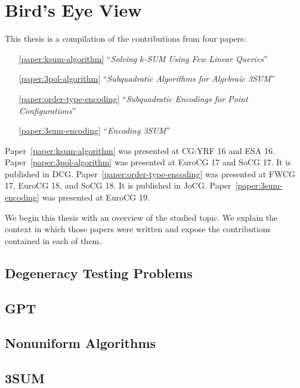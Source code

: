 \chapter{Bird's Eye View}



This thesis is a compilation of the contributions from four papers:
%
\begin{enumerate}
	\item[\ref{paper:ksum-algorithm}] ``\emph{Solving \(k\)-SUM Using Few Linear Queries}''~\cite{CIO16}
	\item[\ref{paper:3pol-algorithm}] ``\emph{Subquadratic Algorithms for Algebraic 3SUM}''~\cite{BCILOS19}
	\item[\ref{paper:order-type-encoding}] ``\emph{Subquadratic Encodings for Point Configurations}''~\cite{CCILO19}
	\item[\ref{paper:3sum-encoding}] ``\emph{Encoding 3SUM}''~\cite{CCILMO19}
\end{enumerate}
%
Paper~\ref{paper:ksum-algorithm} was presented at CG:YRF 16 and ESA 16.
%
Paper~\ref{paper:3pol-algorithm} was presented at EuroCG 17 and SoCG 17. It is published in DCG.
%
Paper~\ref{paper:order-type-encoding} was presented at FWCG 17, EuroCG 18, and SoCG 18. It is published in JoCG.
%
Paper~\ref{paper:3sum-encoding} was presented at EuroCG 19.

We begin this thesis with an overview of the studied topic.
%
We explain the context in which those papers were written and expose
the contributions contained in each of them.

\section*{Degeneracy Testing Problems}


\section*{GPT}


\section*{Nonuniform Algorithms}


\section*{3SUM}


